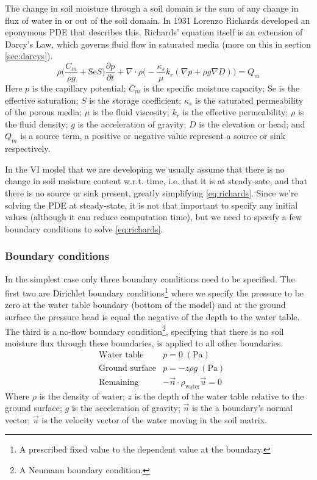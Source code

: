 The change in soil moisture through a soil domain is the sum of any change in flux of water in or out of the soil domain.
In 1931 Lorenzo Richards\cite{richards_capillary_1931} developed an eponymous PDE that describes this.
Richards' equation itself is an extension of Darcy's Law, which governs fluid flow in saturated media (more on this in section \ref{sec:darcys}).
\begin{equation}\label{eq:richards}
  \rho \Big( \frac{C_m}{\rho g} + \mathrm{Se}S \Big) \frac{\partial p}{\partial t} +
  \nabla \cdot \rho \Big( -\frac{\kappa_s}{\mu} k_r (\nabla p + \rho g \nabla D)\Big) =
  Q_m
\end{equation}
Here $p$ is the capillary potential; $C_m$ is the specific moisture capacity; $\mathrm{Se}$ is the effective saturation; $S$ is the storage coefficient; $\kappa_s$ is the saturated permeability of the porous media; $\mu$ is the fluid viscosity; $k_r$ is the effective permeability; $\rho$ is the fluid density; $g$ is the acceleration of gravity; $D$ is the elevation or head; and $Q_m$ is a source term, a positive or negative value represent a source or sink respectively.\par

In the VI model that we are developing we usually assume that there is no change in soil moisture content w.r.t. time, i.e. that it is at steady-sate, and that there is no source or sink present, greatly simplifying \eqref{eq:richards}.
Since we're solving the PDE at steady-state, it is not that important to specify any initial values (although it can reduce computation time), but we need to specify a few boundary conditions to solve \eqref{eq:richards}.

\subsubsection{Boundary conditions}

In the simplest case only three boundary conditions need to be specified.
The first two are Dirichlet boundary conditions\footnote{A prescribed fixed value to the dependent value at the boundary.} where we specify the pressure to be zero at the water table boundary (bottom of the model) and at the ground surface the pressure head is equal the negative of the depth to the water table.
The third is a no-flow boundary condition\footnote{A Neumann boundary condition.}, specifying that there is no soil moisture flux through these boundaries, is applied to all other boundaries.
\begin{align}\label{eq:richards_bc}
  &\text{Water table} &p = 0 \; \mathrm{(Pa)}\\
  &\text{Ground surface} &p =  -z\rho g \; \mathrm{(Pa)} \\
  &\text{Remaining} &-\vec{n}\cdot\rho_\mathrm{water}\vec{u} = 0
\end{align}
Where $\rho$ is the density of water; $z$ is the depth of the water table relative to the ground surface; $g$ is the acceleration of gravity; $\vec{n}$ is the a boundary's normal vector; $\vec{u}$ is the velocity vector of the water moving in the soil matrix.\par
